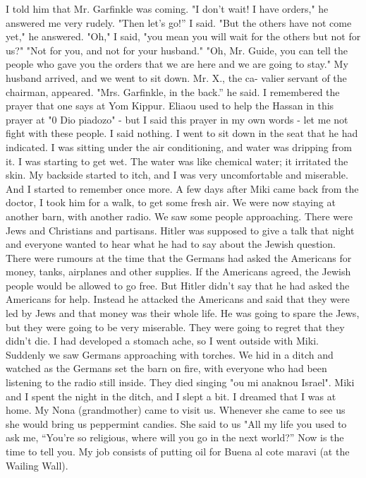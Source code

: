 I told him that Mr.
Garfinkle was coming.
"I don't wait!
I have orders," he answered me very rudely.
"Then let's go!” I said.
"But the others have not come yet," he answered.
"Oh," I said, "you mean you will wait for the others but not for 
us?"
"Not for you, and not for your husband."
"Oh, Mr.
Guide, you can tell the people who gave you the orders that 
we are here and we are going to stay."
My husband arrived, and we went to sit down.
Mr.
X., the ca-
valier servant of the chairman, appeared.
"Mrs.
Garfinkle, in the back.” 
he said.
I remembered the prayer that one says at Yom Kippur.
Eliaou 
used to help the Hassan in this prayer at "0 Dio piadozo" - but I said 
this prayer in my own words - let me not fight with these people.
I said 
nothing.
I went to sit down in the seat that he had indicated.
I was sitting under the air conditioning, and water was dripping from it.
I was starting to get wet.
The water was like chemical water; it irritated 
the skin.
My backside started to itch, and I was very uncomfortable 
and miserable.
And I started to remember once more.
A few days after Miki came back from the doctor, I took him for a 
walk, to get some fresh air.
We were now staying at another barn, with 
another radio.
We saw some people approaching.
There were Jews and 
Christians and partisans.
Hitler was supposed to give a talk that night 
and everyone wanted to hear what he had to say about the Jewish question.
There were rumours at the time that the Germans had asked the Americans 
for money, tanks, airplanes and other supplies.
If the Americans agreed, 
the Jewish people would be allowed to go free.
But Hitler didn't say 
that he had asked the Americans for help.
Instead he attacked the Americans and said that they were led by Jews and that money was their 
whole life.
He was going to spare the Jews, but they were going to be very miserable.
They were going to regret that they didn't die.
I had developed a stomach ache, so I went outside with Miki.
Suddenly we saw Germans approaching with torches.
We hid in a ditch and watched as the Germans set the barn on fire, with everyone who had been listening to the radio still inside.
They died singing "ou mi anaknou Israel".
Miki and I spent the night in the ditch, and I slept a bit.
I 
dreamed that I was at home.
My Nona (grandmother) came to visit us.
Whenever she came to see us she would bring us peppermint candies.
She 
said to us "All my life you used to ask me, “You're so religious, where 
will you go in the next world?” Now is the time to tell you.
My job 
consists of putting oil for Buena al cote maravi (at the Wailing Wall).
